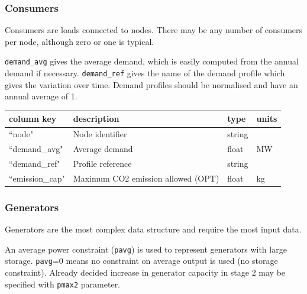 \documentclass{article}
\begin{document}
\subsubsection{Consumers}
Consumers are loads connected to nodes. There may be any number of consumers per node, although zero or one is typical.

\texttt{demand\_avg} gives the average demand, which is easily computed from the annual demand if necessary.
\texttt{demand\_ref} gives the name of the demand profile which gives the variation over time. Demand profiles should be normalised and have an annual average of 1.

\medskip
\begin{tabular}{llll}
	\hline
	column key & description & type & units \\
	\hline
	``node"			& Node identifier 	& string		& \\
	``demand\_avg"		& Average demand	& float		& MW \\
	``demand\_ref"		& Profile reference	& string	&  \\
	``emission\_cap"		& Maximum CO2 emission allowed	(OPT) & float	&   kg\\	\hline
\end{tabular}


\subsubsection{Generators}
Generators are the most complex data structure and require the most input data.

An average power constraint (\texttt{pavg}) is used to represent generators with large storage.
\texttt{pavg}=0 means no constraint on average output is used (no storage constraint). 
Already decided increase in generator capacity in stage 2 may be specified with \texttt{pmax2} parameter. 
\end{document}
